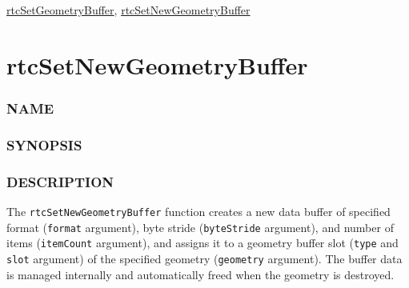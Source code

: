 \hyperref[rtcsetgeometrybuffer]{rtcSetGeometryBuffer},
\hyperref[rtcsetnewgeometrybuffer]{rtcSetNewGeometryBuffer}

\pagebreak

\section{rtcSetNewGeometryBuffer}\label{rtcsetnewgeometrybuffer}

\subsubsection{NAME}\label{name}

\begin{Shaded}
\begin{Highlighting}[]
\OperatorTok{{-}}
\end{Highlighting}
\end{Shaded}

\subsubsection{SYNOPSIS}\label{synopsis}

\begin{Shaded}
\begin{Highlighting}[]

\OperatorTok{*}\OperatorTok{(}
\OperatorTok{,}
  \OperatorTok{,}
   \OperatorTok{,}
  \OperatorTok{,}
  \OperatorTok{,}
\OperatorTok{);}
\end{Highlighting}
\end{Shaded}

\subsubsection{DESCRIPTION}\label{description}

The \texttt{rtcSetNewGeometryBuffer} function creates a new data buffer
of specified format (\texttt{format} argument), byte stride
(\texttt{byteStride} argument), and number of items (\texttt{itemCount}
argument), and assigns it to a geometry buffer slot (\texttt{type} and
\texttt{slot} argument) of the specified geometry (\texttt{geometry}
argument). The buffer data is managed internally and automatically freed
when the geometry is destroyed.

